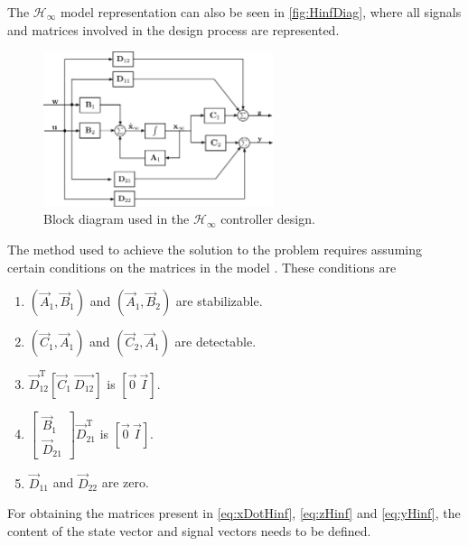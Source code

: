 The $\mathcal{H}_\infty$ model representation can also be seen in \autoref{fig:HinfDiag}, where all signals and matrices involved in the design process are represented.
\begin{figure}[H]
	\includegraphics[width=0.6\textwidth]{figures/HinfDiag}
	\caption{Block diagram used in the $\mathcal{H}_\infty$ controller design.}
	\label{fig:HinfDiag}
\end{figure}

The method used to achieve the solution to the problem requires assuming certain conditions on the matrices in the model \cite[p. 835]{JCDoyle}. These conditions are 
\begin{enumerate}
	\item $\left (\vec{A}_1,\vec{B}_1 \right)$ and $\left( \vec{A}_1, \vec{B}_2 \right)$ are stabilizable.
	\item $\left (\vec{C}_1,\vec{A}_1 \right)$ and $\left( \vec{C}_2, \vec{A}_1 \right)$ are detectable.
	\item $\vec{D}_{12}^\mathrm{T}[\vec{C}_1\ \vec{D_{12}}]$ is $[\vec{0}\ \vec{I}]$.
	\item $\begin{bmatrix}
				\vec{B}_1 \\
				\vec{D}_{21} 
			\end{bmatrix}\vec{D}_{21}^\mathrm{T}$ is $[\vec{0}\ \vec{I}]$.
	\item $\vec{D}_{11}$ and $\vec{D}_{22}$ are zero.
\end{enumerate}

For obtaining the matrices present in \autoref{eq:xDotHinf}, \ref{eq:zHinf} and \ref{eq:yHinf}, the content of the state vector and signal vectors needs to be defined.

